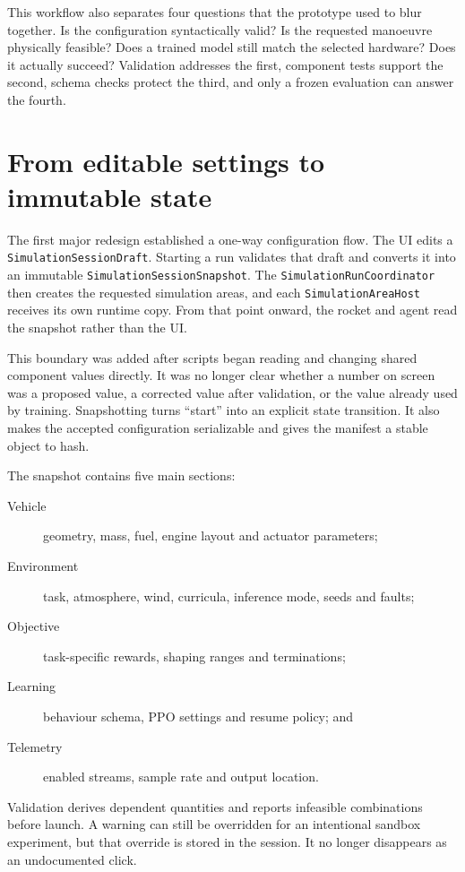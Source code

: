 This workflow also separates four questions that the prototype used to blur together. Is the
configuration syntactically valid? Is the requested manoeuvre physically feasible? Does a
trained model still match the selected hardware? Does it actually succeed? Validation addresses
the first, component tests support the second, schema checks protect the third, and only a
frozen evaluation can answer the fourth.

\section{From editable settings to immutable state}

The first major redesign established a one-way configuration flow. The UI edits a
\texttt{SimulationSessionDraft}. Starting a run validates that draft and converts it into an
immutable \texttt{SimulationSessionSnapshot}. The \texttt{SimulationRunCoordinator} then creates
the requested simulation areas, and each \texttt{SimulationAreaHost} receives its own runtime
copy. From that point onward, the rocket and agent read the snapshot rather than the UI.

This boundary was added after scripts began reading and changing shared component values
directly. It was no longer clear whether a number on screen was a proposed value, a corrected
value after validation, or the value already used by training. Snapshotting turns ``start'' into
an explicit state transition. It also makes the accepted configuration serializable and gives
the manifest a stable object to hash.

The snapshot contains five main sections:

\begin{description}
  \item[Vehicle] geometry, mass, fuel, engine layout and actuator parameters;
  \item[Environment] task, atmosphere, wind, curricula, inference mode, seeds and faults;
  \item[Objective] task-specific rewards, shaping ranges and terminations;
  \item[Learning] behaviour schema, PPO settings and resume policy; and
  \item[Telemetry] enabled streams, sample rate and output location.
\end{description}

Validation derives dependent quantities and reports infeasible combinations before launch. A
warning can still be overridden for an intentional sandbox experiment, but that override is
stored in the session. It no longer disappears as an undocumented click.

